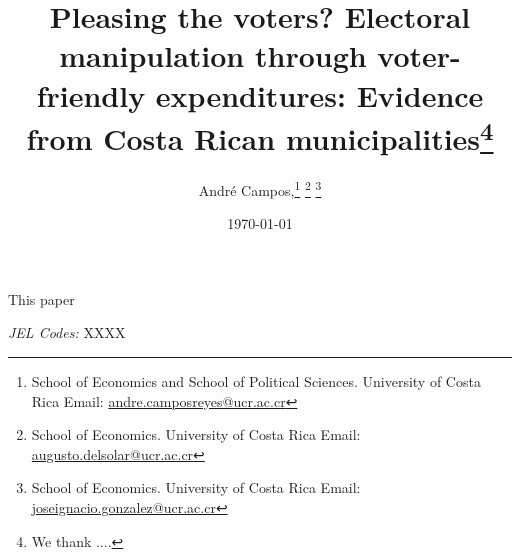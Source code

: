 \documentclass[12pt,letterpaper]{article}
\title{\LARGE{Pleasing the voters? Electoral manipulation through voter-friendly expenditures: Evidence from Costa Rican municipalities}\thanks{\footnotesize We thank ....}}
\author{\large \vspace{0.5cm} André Campos,\thanks{School of Economics and School of Political Sciences. University of Costa Rica Email: \href{mailto:andre.camposreyes@ucr.ac.cr}{andre.camposreyes@ucr.ac.cr}}
	\text{ Augusto del Solar}\thanks{School of Economics. University of Costa Rica Email: \href{mailto:augusto.delsolar@ucr.ac.cr}{augusto.delsolar@ucr.ac.cr}}
	\text{ and José I. González-Rojas}\thanks{School of Economics. University of Costa Rica Email: \href{mailto:joseignacio.gonzalez@ucr.ac.cr}{joseignacio.gonzalez@ucr.ac.cr}}
}
\date{\today}
\begin{document}
	\onehalfspacing
	\setlength{\parindent}{1cm}
	\clearpage\maketitle
	\thispagestyle{empty}
	\setcounter{page}{0}
	\maketitle
	
	\begin{small}
		\onehalfspacing
		\vspace{0.75cm}
		This paper 
		\vspace{20pt}
		
		\textit{JEL Codes:} XXXX
	\end{small}
	
	\newpage
	\setcounter{page}{1}
	












\newpage

\printbibliography

\newpage


	
\end{document}
